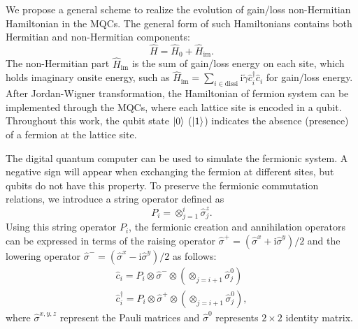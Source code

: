 \documentclass[longbibliography, aps, prx, amsmath, amssymb, amsfonts, twocolumn,superscriptaddress, footinbib]{revtex4-1}
\begin{document}
	We propose a general scheme to realize the evolution of gain/loss non-Hermitian Hamiltonian in the MQCs.
	The general form of such Hamiltonians contains both Hermitian and non-Hermitian components:
	\begin{equation}
		\hat{H} = \hat{H}_0 +\hat{H}_{\text{im}}. \label{eq:non-hermitian}
	\end{equation}
	The non-Hermitian part $\hat{H}_{\text{im}}$ is the sum of gain/loss energy on each site, which holds imaginary onsite energy, such as $\hat{H}_{\text{im}} = \sum_{i\in \text{dissi}} \mathrm{i}\tilde{\gamma} \hat{c}_i^{\dagger} \hat{c}_i$ for gain/loss energy. 
	After Jordan-Wigner transformation, the Hamiltonian of fermion system can be implemented through the MQCs, where each lattice site is encoded in a qubit. 
	Throughout this work, the qubit state $\ket{0}$ ($\ket{1}$) indicates the absence (presence) of a fermion at the lattice site.

	The digital quantum computer can be used to simulate the fermionic system. 
	A negative sign will appear when exchanging the fermion at different sites, but qubits do not have this property. 
	To preserve the fermionic commutation relations, we introduce a string operator defined as
	\begin{equation}
		P_i = \otimes_{j=1}^i\hat{\sigma}^z_j.
	\end{equation}
	Using this string operator $P_i$, the fermionic creation and annihilation operators can be expressed in terms of the raising operator $\hat{\sigma}^+=(\hat{\sigma}^x+\mathrm{i}\hat{\sigma}^y)/2$ and the lowering operator $\hat{\sigma}^-=(\hat{\sigma}^x-\mathrm{i}\hat{\sigma}^y)/2$ as follows:
	\begin{equation}
		\begin{split}
			\hat{c}_i = P_i \otimes \hat{\sigma}^{-}\otimes (\otimes_{j=i+1}\hat{\sigma}^0_j)\\
			\hat{c}_i^{\dagger} = P_i \otimes \hat{\sigma}^{+}\otimes (\otimes_{j=i+1}\hat{\sigma}^0_j),
		\end{split}
	\end{equation}
	where $\hat{\sigma}^{x,y,z}$ represent the Pauli matrices and $\hat{\sigma}^0$ represents $2\times 2$ identity matrix. 
	
\end{document}
